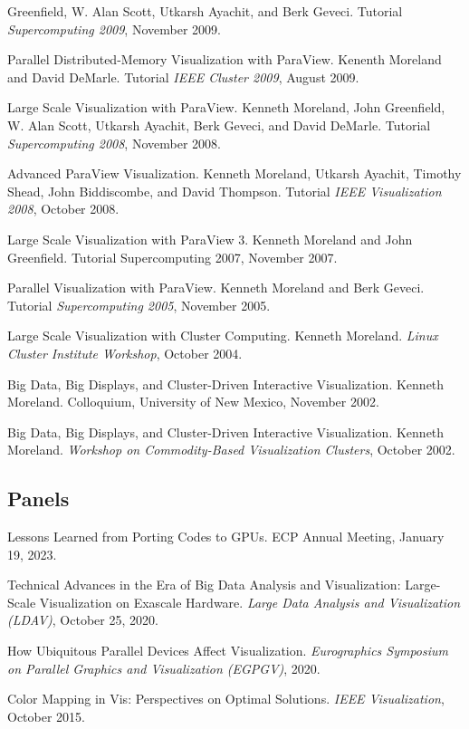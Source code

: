 \documentclass{article}
\begin{document}
\begin{enumerate}[label={[\arabic*]}]
  Greenfield, W. Alan Scott, Utkarsh Ayachit, and Berk Geveci. Tutorial
  \emph{Supercomputing 2009}, November 2009.
\item Parallel Distributed-Memory Visualization with ParaView. Kenenth
  Moreland and David DeMarle. Tutorial \emph{IEEE Cluster 2009}, August
  2009.
\item Large Scale Visualization with ParaView. Kenneth Moreland, John
  Greenfield, W. Alan Scott, Utkarsh Ayachit, Berk Geveci, and David
  DeMarle. Tutorial \emph{Supercomputing 2008}, November 2008.
\item Advanced ParaView Visualization. Kenneth Moreland, Utkarsh
  Ayachit, Timothy Shead, John Biddiscombe, and David
  Thompson. Tutorial \emph{IEEE Visualization 2008}, October 2008.
\item Large Scale Visualization with ParaView 3. Kenneth Moreland and
  John Greenfield. Tutorial Supercomputing 2007, November 2007.
\item Parallel Visualization with ParaView. Kenneth Moreland and Berk
  Geveci. Tutorial \emph{Supercomputing 2005}, November 2005.
\item Large Scale Visualization with Cluster Computing. Kenneth
  Moreland. \emph{Linux Cluster Institute Workshop}, October 2004.
\item Big Data, Big Displays, and Cluster-Driven Interactive
  Visualization. Kenneth Moreland. Colloquium, University of New
  Mexico, November 2002.
\item Big Data, Big Displays, and Cluster-Driven Interactive
  Visualization. Kenneth Moreland. \emph{Workshop on Commodity-Based
  Visualization Clusters}, October 2002.
\end{enumerate}


\subsection*{Panels}

\begin{enumerate}[label={[\arabic*]}]
\item Lessons Learned from Porting Codes to GPUs.
  ECP Annual Meeting, January 19, 2023.
\item Technical Advances in the Era of Big Data Analysis and Visualization: Large-Scale Visualization on Exascale Hardware.
  \emph{Large Data Analysis and Visualization (LDAV)}, October 25, 2020.
\item How Ubiquitous Parallel Devices Affect Visualization.
  \emph{Eurographics Symposium on Parallel Graphics and Visualization (EGPGV)}, 2020.
\item Color Mapping in Vis: Perspectives on Optimal Solutions.
  \emph{IEEE Visualization}, October 2015.
\end{enumerate}
\end{document}
